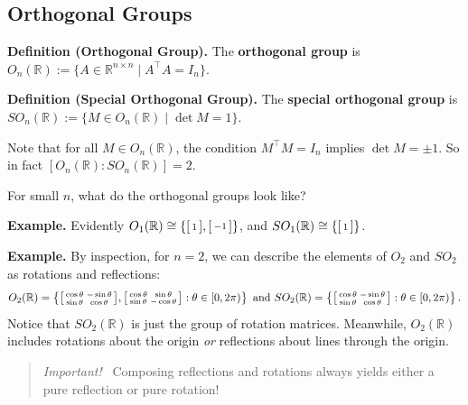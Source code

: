 \subsection{Orthogonal Groups}

\textbf{Definition (Orthogonal Group).} The \textbf{orthogonal group} is $O_n(\mathbb{R}) := \{A \in \mathbb{R}^{n \times n} \mid A^{\top} A = I_n \}$.

\textbf{Definition (Special Orthogonal Group).} The \textbf{special orthogonal group} is $SO_n(\mathbb{R}) := \{M \in O_n(\mathbb{R}) \mid \det M = 1\}$. 

Note that for all $M \in O_n(\mathbb{R})$, the condition $M^{\top}M = I_n$ implies $\det M = \pm 1$.  So in fact $[O_n(\mathbb{R}): SO_n(\mathbb{R})] = 2$.

For small $n$, what do the orthogonal groups look like?

\textbf{Example.} Evidently $O_1(\mathbb{R}) \cong \{ \begin{bsmallmatrix} 1 \end{bsmallmatrix} , \begin{bsmallmatrix} -1 \end{bsmallmatrix} \}$, and $SO_1(\mathbb{R}) \cong \{\begin{bsmallmatrix} 1 \end{bsmallmatrix} \}$.

\textbf{Example.} By inspection, for $n = 2$, we can describe the elements of $O_2$ and $SO_2$ as rotations and reflections:
\[ O_2(\mathbb{R}) = \left \{ \begin{bsmallmatrix} \cos \theta & - \sin \theta \\ \sin \theta & \cos \theta \end{bsmallmatrix}, \begin{bsmallmatrix} \cos \theta & \sin \theta \\ \sin \theta & - \cos \theta \end{bsmallmatrix} : \theta \in [0, 2\pi) \right \} \text{ and } SO_2(\mathbb{R}) = \left \{ \begin{bsmallmatrix} \cos \theta & -\sin \theta \\ \sin \theta & \cos \theta \end{bsmallmatrix}: \theta \in [0, 2\pi) \right \}. \]
Notice that $SO_2(\mathbb{R})$ is just the group of rotation matrices.  Meanwhile, $O_2(\mathbb{R})$ includes rotations about the origin \emph{or} reflections about lines through the origin.

\begin{quote}
    \textcolor{red!75}{\emph{Important!}} \ \textcolor{black!60}{Composing reflections and rotations always yields either a pure reflection or pure rotation!}
\end{quote}

